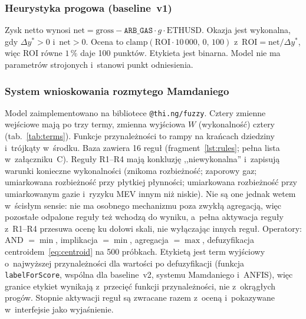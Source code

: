 \subsubsection{Heurystyka progowa (baseline~v1)}
Zysk netto wynosi $\mathrm{net} = \mathrm{gross} - \texttt{ARB\_GAS}\cdot g\cdot\mathrm{ETHUSD}$.
Okazja jest wykonalna, gdy $\Delta y^{*}>0$ i~$\mathrm{net}>0$. Ocena to
$\mathrm{clamp}(\mathrm{ROI}\cdot 10\,000,\,0,\,100)$ z~$\mathrm{ROI}=\mathrm{net}/\Delta y^{*}$,
więc ROI równe $1\,\%$ daje 100 punktów. Etykieta jest binarna. Model nie ma parametrów
strojonych i~stanowi punkt odniesienia.

\subsubsection{System wnioskowania rozmytego Mamdaniego}
Model zaimplementowano na bibliotece \texttt{@thi.ng/fuzzy}. Cztery
zmienne wejściowe mają po trzy termy, zmienna wyjściowa $W$ (wykonalność) cztery
(tab.~\ref{tab:terms}). Funkcje przynależności to rampy na krańcach dziedziny i~trójkąty
w~środku. Baza zawiera 16 reguł (fragment~\ref{lst:rules}; pełna lista w~załączniku~C). Reguły
R1--R4 mają konkluzję ,,niewykonalna'' i~zapisują warunki konieczne wykonalności (znikoma
rozbieżność; zaporowy gaz; umiarkowana rozbieżność przy płytkiej płynności; umiarkowana
rozbieżność przy umiarkowanym gazie i~ryzyku MEV innym niż niskie). Nie są one jednak wetem
w~ścisłym sensie: nie ma osobnego mechanizmu poza zwykłą agregacją, więc pozostałe odpalone reguły
też wchodzą do wyniku, a~pełna aktywacja reguły z~R1--R4 przesuwa ocenę ku dołowi skali, nie
wyłączając innych reguł. Operatory: AND $=\min$, implikacja $=\min$, agregacja $=\max$,
defuzyfikacja centroidem~\eqref{eq:centroid} na 500 próbkach.
Etykietą jest term wyjściowy o~najwyższej przynależności dla wartości po defuzyfikacji (funkcja
\texttt{labelForScore}, wspólna dla baseline~v2, systemu Mamdaniego i~ANFIS), więc granice etykiet wynikają z~przecięć
funkcji przynależności, nie z~okrągłych progów. Stopnie aktywacji reguł są zwracane razem
z~oceną i~pokazywane w~interfejsie jako wyjaśnienie.

